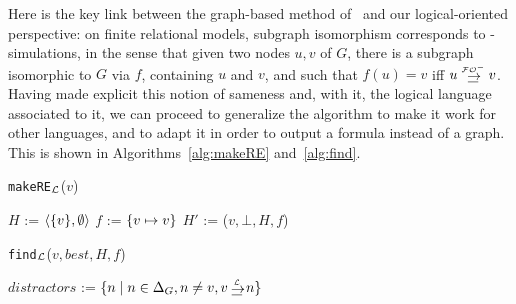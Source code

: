 Here is the key link between the graph-based method
of~\cite{Krahmer2003} and our logical-oriented perspective: on
finite relational models, subgraph isomorphism corresponds to
\EPFOL-simulations, in the sense that given two nodes $u,v$ of
$G$, there is a subgraph isomorphic to $G$ via $f$, containing $u$ and
$v$, and such that $f(u)=v$ iff $u \simul{\+\EPFOL} v$.
%
Having made explicit this notion of sameness and, with it, the
logical language associated to it, we can proceed to generalize the
algorithm to make it work for other languages, and to adapt it in
order to output a formula instead of a graph. This is shown in
Algorithms~\ref{alg:makeRE} and~\ref{alg:find}.
%
\begin{center}\begin{minipage}[t]{5.1cm}%
\begin{algorithm}[H]\small
{}

\caption{\small \texttt{makeRE}$_{\mathcal{L}}$($v$)}\label{alg:makeRE}


\BlankLine

\vspace{3.0pt}

\BlankLine

$H$ := $\langle \{v\},\emptyset\rangle$\; $f$ := $\{v \mapsto v\}$\;
$H'$ := \findGraph($v, \bot, H, f$)\;
\BlankLine
{}\;
\end{algorithm}
  \end{minipage}
\hspace{.05cm}
  \begin{minipage}[t]{6.8cm}%
\begin{algorithm}[H] \small
{} 


\caption{\small \texttt{find}$_{\mathcal{L}}$($v, \mathit{best},
H,f$)}\label{alg:find}

 $\mathit{distractors}$ :=
$\cset{n \mid n \in \Delta_G, n \neq v , v \simul{\+L} n}$\;
 \;
\end{algorithm}
  \end{minipage}%
\end{center}
